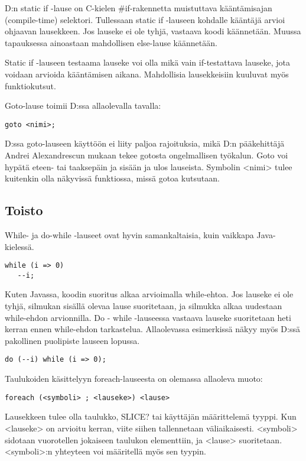\documentclass[11pt,oneside,a4paper]{article}
\begin{document}
D:n static if -lause on C-kielen \#if-rakennetta muistuttava kääntämisajan
(compile-time) selektori. Tullessaan static if -lauseen kohdalle kääntäjä arvioi
ohjaavan lausekkeen. Jos lauseke ei ole tyhjä, vastaava koodi käännetään. Muussa
tapauksessa ainoastaan mahdollisen else-lause käännetään. 

Static if -lauseen testaama lauseke voi olla mikä vain if-testattava lauseke,
jota voidaan arvioida kääntämisen aikana. Mahdollisia lausekkeisiin kuuluvat
myös funktiokutsut.

Goto-lause toimii D:ssa allaolevalla tavalla:

\begin{verbatim}
goto <nimi>;
\end{verbatim}

D:ssa goto-lauseen käyttöön ei liity paljoa rajoituksia, mikä D:n pääkehittäjä
Andrei Alexandrescun mukaan tekee gotosta ongelmallisen työkalun. Goto voi
hypätä eteen- tai taaksepäin ja sisään ja ulos lauseista. Symbolin <nimi> tulee
kuitenkin olla näkyvissä funktiossa, missä gotoa kutsutaan. 


\subsection{Toisto}

While- ja do-while -lauseet ovat hyvin samankaltaisia, kuin vaikkapa
Java-kielessä. 

\begin{verbatim}
while (i => 0)
   --i;
\end{verbatim}

Kuten Javassa, koodin suoritus alkaa arvioimalla while-ehtoa. Jos lauseke ei ole
tyhjä, silmukan sisällä olevaa lause suoritetaan, ja silmukka alkaa uudestaan
while-ehdon arvionnilla. Do - while -lauseessa vastaava lauseke suoritetaan heti
kerran ennen while-ehdon tarkastelua. Allaolevassa esimerkissä näkyy myös D:ssä
pakollinen puolipiste lauseen lopussa.

\begin{verbatim}
do (--i) while (i => 0);
\end{verbatim}

Taulukoiden käsittelyyn foreach-lauseesta on olemassa allaoleva muoto:

\begin{verbatim}
foreach (<symboli> ; <lauseke>) <lause>
\end{verbatim}

Lausekkeen tulee olla taulukko, SLICE? tai käyttäjän määrittelemä tyyppi. Kun
<lauseke> on arvioitu kerran, viite siihen tallennetaan väliaikaisesti.
<symboli> sidotaan vuorotellen jokaiseen taulukon elementtiin, ja <lause>
suoritetaan. <symboli>:n yhteyteen voi määritellä myös sen tyypin. 
\end{document}
